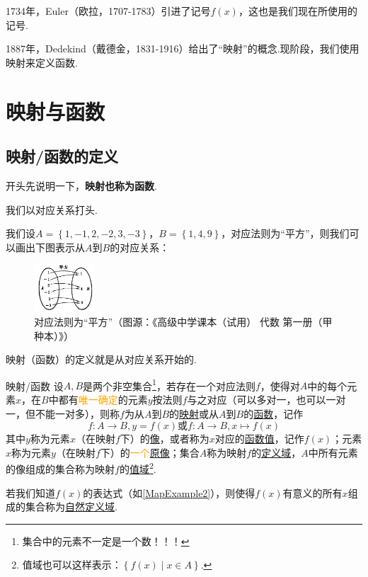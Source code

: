 \documentclass[lang=cn,math=cm,chinesefont=nofont,11pt,scheme=chinese,twocol]{elegantbook}
\begin{document}
1734年，Euler（欧拉，1707-1783）引进了记号$f(x)$，这也是我们现在所使用的记号.

1887年，Dedekind（戴德金，1831-1916）给出了“映射”的概念.现阶段，我们使用映射来定义函数.

\section{映射与函数}

\subsection{映射/函数的定义}

开头先说明一下，\textbf{映射也称为函数}.

我们以对应关系打头.

\begin{example}
  我们设$A=\left\{1,-1,2,-2,3,-3\right\}$，$B=\left\{1,4,9\right\}$，对应法则为“平方”，则我们可以画出下图表示从$A$到$B$的对应关系：
\end{example}

\begin{figure}[h]
  \centering
  \includegraphics[width=0.2\textwidth]{image/map2.1.1.png}
  \caption{对应法则为“平方”（图源：《高级中学课本（试用） 代数 第一册（甲种本）》）}
  \label{img:map1}
\end{figure}

映射（函数）的定义就是从对应关系开始的.

\begin{definition}{映射/函数}\label{def:map}
  设$A,B$是两个非空集合\footnote{集合中的元素不一定是一个数！！！}，若存在一个对应法则$f$，使得对$A$中的每个元素$x$，在$B$中都有\textcolor{orange}{唯一确定}的元素$y$按法则$f$与之对应（可以多对一，也可以一对一，但不能一对多），则称$f$为从$A$到$B$的\underline{映射}或从$A$到$B$的\underline{函数}，记作$$f:A\rightarrow B,y=f(x)\text{或}f:A\rightarrow B,x\mapsto f(x)$$其中$y$称为元素$x$（在映射$f$下）的\underline{像}，或者称为$x$对应的\underline{函数值}，记作$f(x)$；元素$x$称为元素$y$（在映射$f$下）的\textcolor{orange}{一个}\underline{原像}；集合$A$称为映射$f$的\underline{定义域}，$A$中所有元素的像组成的集合称为映射$f$的\underline{值域}\footnote{值域也可以这样表示：$\left\{f(x)\mid x\in A\right\}.$}.

  若我们知道$f(x)$的表达式（如\ref{MapExample2}），则使得$f(x)$有意义的所有$x$组成的集合称为\underline{自然定义域}.
\end{definition}
\end{document}
